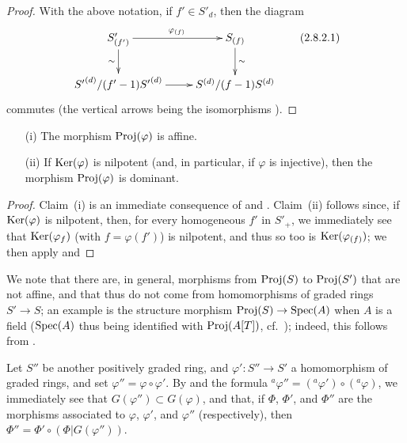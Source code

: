 \begin{proof}
With the above notation, if $f'\in S'_d$, then the diagram
\[
\label{II.2.8.2.1}
  \xymatrix{
    S'_{(f')} \ar[r]^{\varphi_{(f)}} \ar[d]_{\sim}
    & S_{(f)} \ar[d]^{\sim}
  \\{S'}^{(d)}/(f'-1){S'}^{(d)} \ar[r]
    & S^{(d)}/(f-1)S^{(d)}
  }
\tag{2.8.2.1}
\]
commutes (the vertical arrows being the isomorphisms ).
\end{proof}

\begin{corollary}[2.8.3]
\label{II.2.8.3}
\begin{enumerate}
  \item[{\rm(i)}] The morphism $\operatorname{Proj}(\varphi)$ is affine.
  \item[{\rm(ii)}] If $\operatorname{Ker}(\varphi)$ is nilpotent (and, in particular, if $\varphi$ is injective), then the morphism $\operatorname{Proj}(\varphi)$ is dominant.
\end{enumerate}
\end{corollary}

\begin{proof}
Claim~(i) is an immediate consequence of  and .
Claim~(ii) follows since, if $\operatorname{Ker}(\varphi)$ is nilpotent, then, for every homogeneous $f'$ in $S'_+$, we immediately see that $\operatorname{Ker}(\varphi_f)$ (with $f=\varphi(f')$) is nilpotent, and thus so too is $\operatorname{Ker}(\varphi_{(f)})$;
we then apply  and 
\end{proof}

We note that there are, in general, morphisms from $\operatorname{Proj}(S)$ to $\operatorname{Proj}(S')$ that are not affine, and that thus do not come from homomorphisms of graded rings $S'\to S$;
an example is the structure morphism $\Proj(S)\to\Spec(A)$ when $A$ is a field ($\operatorname{Spec}(A)$ thus being identified with $\operatorname{Proj}(A[T])$, cf.~);
indeed, this follows from .

\begin{env}[2.8.4]
\label{II.2.8.4}
Let $S''$ be another positively graded ring, and $\varphi':S''\to S'$ a homomorphism of graded rings, and set $\varphi''=\varphi\circ\varphi'$.
By  and the formula ${}^a\varphi''=({}^a\varphi')\circ({}^a\varphi)$, we immediately see that $G(\varphi'')\subset G(\varphi)$, and that, if $\Phi$, $\Phi'$, and $\Phi''$ are the morphisms associated to $\varphi$, $\varphi'$, and $\varphi''$ (respectively), then $\Phi''=\Phi'\circ(\Phi|G(\varphi''))$.
\end{env}

